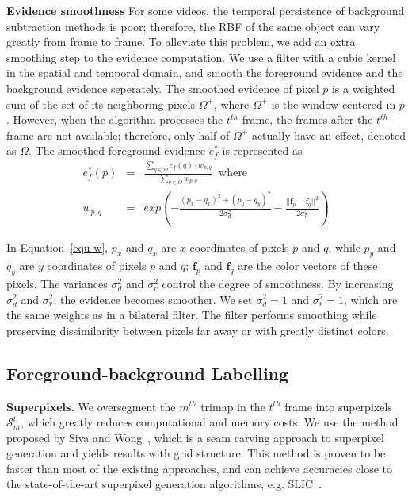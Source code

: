 \textbf{Evidence smoothness}
For some videos, the temporal persistence of background subtraction methods is poor; therefore, the RBF of the same object can vary greatly from frame to frame.
To alleviate this problem, we add an extra smoothing step to the evidence computation. We use a filter with a cubic kernel in the spatial and temporal domain, and smooth the foreground evidence and the background evidence seperately.
The smoothed evidence of pixel $p$ is a weighted sum of the set of its neighboring pixels $\Omega^{+}$, where $\Omega^{+}$ is the window centered in $p$.
However, when the algorithm processes the $t^{th}$ frame, the frames after the $t^{th}$ frame are not available; therefore, only half of $\Omega^{+}$ actually have an effect, denoted as $\Omega$. The smoothed foreground evidence $e_{f}^{*}$ is represented as
\begin{eqnarray}
	e_{f}^{*}(p)&=&\frac{\sum_{q\in\Omega}{e_{f}(q)\cdot w_{p,q}}}{\sum_{q\in\Omega}{w_{p,q}}} \;\; \mbox{where} \label{equ-w} \\
	w_{p,q}&=&exp(-\frac{(p_{x}-q_{x})^2+(p_{y}-q_{y})^2}{2\sigma_{d}^{2}}-\frac{||\mathbf{f}_{p}-\mathbf{f}_{q}||^2}{2\sigma_{r}^2}) \nonumber
\end{eqnarray}

In Equation~\ref{equ-w}, $p_{x}$ and $q_{x}$ are $x$ coordinates of pixels $p$ and $q$, while $p_{y}$ and $q_{y}$ are $y$ coordinates of pixels $p$ and $q$; $\mathbf{f}_{p}$ and $\mathbf{f}_{q}$ are the color vectors of these pixels.
The variances $\sigma_{d}^{2}$ and $\sigma_{r}^2$ control the degree of smoothness. By increasing $\sigma_{d}^{2}$ and $\sigma_{r}^2$, the evidence becomes smoother. We set $\sigma_{d}^{2}=1$ and $\sigma_{r}^2=1$, which are the same weights as in a bilateral filter. The filter performs smoothing while preserving dissimilarity between pixels far away or with greatly distinct colors.

\subsection{Foreground-background Labelling}
\label{method-fbl}

\textbf{Superpixels.}
We oversegment the $m^{th}$ trimap in the $t^{th}$ frame into superpixels $\mathcal{S}_{m}^{t}$, which greatly reduces computational and memory costs.
We use the method proposed by Siva and Wong~\cite{siva2014}, which is a seam carving approach to superpixel generation and yields results with grid structure. This method is proven to be faster than most of the existing approaches, and can achieve accuracies close to the state-of-the-art superpixel generation algorithms, e.g. SLIC~\cite{achanta2012}.

